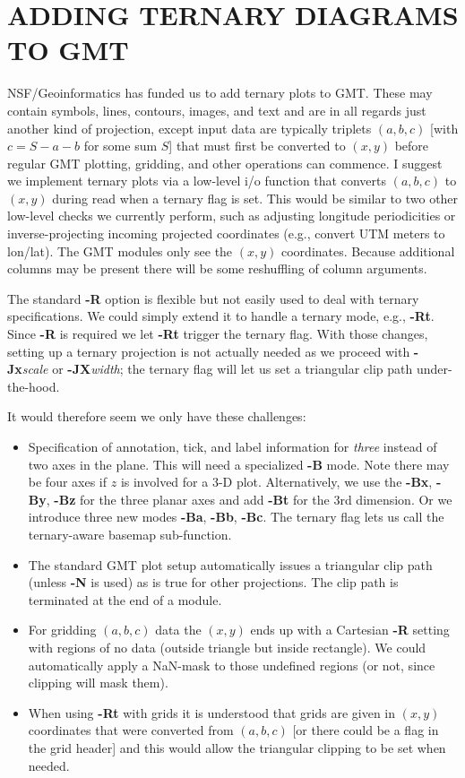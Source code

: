 \documentclass[12pt,letterpaper,margin=0.5in]{report}
\begin{document}
\section*{ADDING TERNARY DIAGRAMS TO GMT}

NSF/Geoinformatics has funded us to add ternary plots to GMT.
These may contain symbols, lines, contours, images, and text and are
in all regards just another kind of projection, except input data are
typically triplets $(a,b,c)$ [with $c = S - a -b$ for some sum $S$] that must first be converted to $(x,y)$ before
regular GMT plotting, gridding, and other operations can commence.  I suggest we implement ternary plots
via a low-level i/o function that converts $(a,b,c)$ to $(x,y)$ during read when a ternary flag is set.
This would be similar to two other low-level checks we currently perform, such as adjusting
longitude periodicities or inverse-projecting incoming projected coordinates (e.g., convert UTM meters to lon/lat).
The GMT modules only see the $(x,y)$ coordinates.
Because additional columns may be present there will be some reshuffling of column arguments.

The standard {\bf -R} option is flexible but not easily
used to deal with ternary specifications.  We could simply extend it to handle
a ternary mode, e.g., {\bf -Rt}.  Since {\bf -R} is required we let {\bf -Rt} trigger the
ternary flag.
With those changes, setting up a ternary projection is not actually needed as we proceed with
{\bf -Jx}{\it scale} or {\bf -JX}{\it width}; the ternary flag will let us set a triangular
clip path under-the-hood. 

It would therefore seem we only have these challenges:
\begin{itemize}
	\item Specification of annotation, tick, and label information for \emph{three} instead of two axes in the plane.
	This will need a specialized {\bf -B} mode.  Note there may be
	four axes if $z$ is involved for a 3-D plot.  Alternatively, we use the {\bf -Bx}, {\bf -By}, {\bf -Bz} for the three
	planar axes and add {\bf -Bt} for the 3rd dimension.  Or we introduce three new modes {\bf -Ba}, {\bf -Bb}, {\bf -Bc}.
	The ternary flag lets us call the ternary-aware basemap sub-function.
	\item The standard GMT plot setup  automatically issues a triangular clip path (unless {\bf -N} is used) as is true
	for other projections.  The clip path is terminated at the end of a module.
	\item For gridding $(a,b,c)$ data the $(x,y)$ ends up with a Cartesian {\bf -R} setting with regions of no data (outside triangle
	but inside rectangle).  We could automatically apply a NaN-mask to those undefined regions (or not, since clipping will mask them).
	\item When using {\bf -Rt} with grids it is understood that grids are given in $(x,y)$ coordinates that were converted
	from $(a,b,c)$ [or there could be a flag in the grid header] and this would allow the triangular clipping to be set when needed.
\end{itemize}
\end{document}
